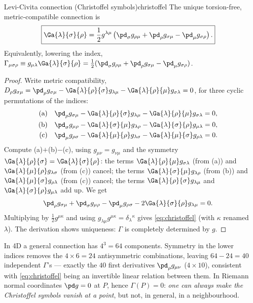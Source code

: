 \begin{theorem}{Levi-Civita connection (Christoffel symbols)}{christoffel}
The unique torsion-free, metric-compatible connection is
\begin{equation}
  \boxed{\Ga{\lambda}{\sigma}{\rho}=\frac12 g^{\lambda\mu}\left(\pd_\sigma g_{\rho\mu}+\pd_\rho g_{\sigma\mu}-\pd_\mu g_{\sigma\rho}\right).}
  \label{eq:christoffel}
\end{equation}
Equivalently, lowering the index, $\Gamma_{\mu\sigma\rho}\equiv g_{\mu\lambda}\Ga{\lambda}{\sigma}{\rho}=\frac12(\pd_\sigma g_{\rho\mu}+\pd_\rho g_{\sigma\mu}-\pd_\mu g_{\sigma\rho})$.
\end{theorem}
\begin{proof}
Write metric compatibility, $D_\rho g_{\sigma\mu}=\pd_\rho g_{\sigma\mu}-\Ga{\lambda}{\rho}{\sigma}g_{\lambda\mu}-\Ga{\lambda}{\rho}{\mu}g_{\sigma\lambda}=0$, for three cyclic permutations of the indices:
\begin{align*}
  \text{(a)}\quad &\pd_\rho g_{\sigma\mu}-\Ga{\lambda}{\rho}{\sigma}g_{\lambda\mu}-\Ga{\lambda}{\rho}{\mu}g_{\sigma\lambda}=0,\\
  \text{(b)}\quad &\pd_\sigma g_{\mu\rho}-\Ga{\lambda}{\sigma}{\mu}g_{\lambda\rho}-\Ga{\lambda}{\sigma}{\rho}g_{\mu\lambda}=0,\\
  \text{(c)}\quad &\pd_\mu g_{\rho\sigma}-\Ga{\lambda}{\mu}{\rho}g_{\lambda\sigma}-\Ga{\lambda}{\mu}{\sigma}g_{\rho\lambda}=0.
\end{align*}
Compute (a)$+$(b)$-$(c), using $g_{\mu\nu}=g_{\nu\mu}$ and the symmetry $\Ga{\lambda}{\rho}{\sigma}=\Ga{\lambda}{\sigma}{\rho}$:
the terms $\Ga{\lambda}{\rho}{\mu}g_{\sigma\lambda}$ (from (a)) and $\Ga{\lambda}{\mu}{\rho}g_{\lambda\sigma}$ (from (c)) cancel; the terms $\Ga{\lambda}{\sigma}{\mu}g_{\lambda\rho}$ (from (b)) and $\Ga{\lambda}{\mu}{\sigma}g_{\rho\lambda}$ (from (c)) cancel; the terms $\Ga{\lambda}{\rho}{\sigma}g_{\lambda\mu}$ and $\Ga{\lambda}{\sigma}{\rho}g_{\mu\lambda}$ add up. We get
\[
  \pd_\rho g_{\sigma\mu}+\pd_\sigma g_{\mu\rho}-\pd_\mu g_{\rho\sigma}-2\Ga{\lambda}{\sigma}{\rho}g_{\lambda\mu}=0 .
\]
Multiplying by $\frac12 g^{\mu\kappa}$ and using $g_{\lambda\mu}g^{\mu\kappa}=\delta_\lambda{}^\kappa$ gives \eqref{eq:christoffel} (with $\kappa$ renamed $\lambda$). The derivation shows uniqueness: $\Gamma$ is completely determined by $g$.
\end{proof}

\begin{remarkbox}[Counting]
In 4D a general connection has $4^3=64$ components. Symmetry in the lower indices removes the $4\times6=24$ antisymmetric combinations, leaving $64-24=40$ independent $\Gamma$'s --- exactly the $40$ first derivatives $\pd_\rho g_{\mu\nu}$ ($4\times10$), consistent with \eqref{eq:christoffel} being an invertible linear relation between them. In Riemann normal coordinates $\pd g=0$ at $P$, hence $\Gamma(P)=0$: \emph{one can always make the Christoffel symbols vanish at a point}, but not, in general, in a neighbourhood.
\end{remarkbox}

